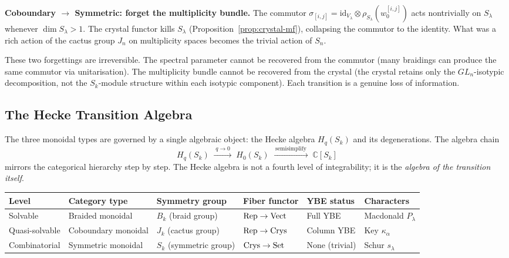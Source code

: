 \medskip
\noindent
\textbf{Coboundary $\to$ Symmetric: forget the multiplicity bundle.}
The commutor $\sigma_{[i,j]} = \mathrm{id}_{V_\lambda} \otimes
\rho_{S_\lambda}(w_0^{[i,j]})$ acts nontrivially on $S_\lambda$
whenever $\dim S_\lambda > 1$.  The crystal functor kills $S_\lambda$
(Proposition~\ref{prop:crystal-mf}), collapsing the commutor to the
identity.  What was a rich action of the cactus group $J_n$ on
multiplicity spaces becomes the trivial action of $S_n$.

\medskip
\noindent
These two forgettings are irreversible.  The spectral parameter cannot
be recovered from the commutor (many braidings can produce the same
commutor via unitarisation).  The multiplicity bundle cannot be
recovered from the crystal (the crystal retains only the
$GL_n$-isotypic decomposition, not the $S_k$-module structure within
each isotypic component).  Each transition is a genuine loss of
information.


\subsection{The Hecke Transition Algebra}
\label{sec:hierarchy-hecke}

The three monoidal types are governed by a single algebraic object:
the Hecke algebra $H_q(S_k)$ and its degenerations.  The algebra
chain
\begin{equation}
\label{eq:hecke-chain}
  H_q(S_k) \;\xrightarrow{\;q \to 0\;}
  \; H_0(S_k) \;\xrightarrow{\;\text{semisimplify}\;}\;
  \mathbb{C}[S_k]
\end{equation}
mirrors the categorical hierarchy step by step.  The Hecke algebra is
not a fourth level of integrability; it is the \emph{algebra of the
transition itself}.

\begin{center}
\renewcommand{\arraystretch}{1.4}
\small
\begin{tabular}{llllll}
\toprule
\textbf{Level} & \textbf{Category type} & \textbf{Symmetry group}
  & \textbf{Fiber functor} & \textbf{YBE status} & \textbf{Characters} \\
\midrule
Solvable & Braided monoidal & $B_k$ (braid group)
  & $\mathrm{Rep} \to \mathrm{Vect}$ & Full YBE & Macdonald $P_\lambda$ \\
Quasi-solvable & Coboundary monoidal & $J_k$ (cactus group)
  & $\mathrm{Rep} \to \mathrm{Crys}$ & Column YBE & Key $\kappa_\alpha$ \\
Combinatorial & Symmetric monoidal & $S_k$ (symmetric group)
  & $\mathrm{Crys} \to \mathrm{Set}$ & None (trivial) & Schur $s_\lambda$ \\
\bottomrule
\end{tabular}
\end{center}


